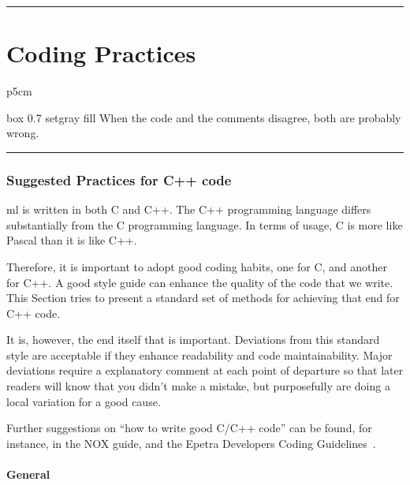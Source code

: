 \documentclass[10pt,letter,relax]{SANDreport}
\newcommand{\HRule}{\noindent\rule{\linewidth}{1mm}}
\newcommand{\ML}     {{\sc ml }}
\begin{document}

\clearpage
\newpage

\vspace*{3cm}
\HRule
\part{Coding Practices}

\medskip

\hfill
\begin{tabular}{p{5cm}}
\begin{boxitpara}{box 0.7 setgray fill}
When the code and the comments disagree, both are probably wrong.
\end{boxitpara}
\end{tabular}

\HRule
\clearpage
\newpage


\section{Suggested Practices for C++ code}
\label{sec:code}

\ML is written in both C and C++.
The C++ programming language differs substantially from the C
programming language. In terms of usage, C is more like Pascal than it
is like C++. 

Therefore, it is important to adopt good coding habits, one for C, and
another for C++. A good style guide can enhance the quality of the code
that we write.  This Section tries to present a standard set of
methods for achieving that end for C++ code.

It is, however, the end itself that is important. Deviations from this
standard style are acceptable if they enhance readability and code
maintainability. Major deviations require a explanatory comment at each
point of departure so that later readers will know that you didn't make
a mistake, but purposefully are doing a local variation for a good
cause.

Further suggestions on ``how to write good C/C++ code'' can be found,
for instance, in the NOX guide, and the Epetra Developers Coding
Guidelines~\cite{Epetra-Dev-Guide}.

\subsection{General}
\end{document}
